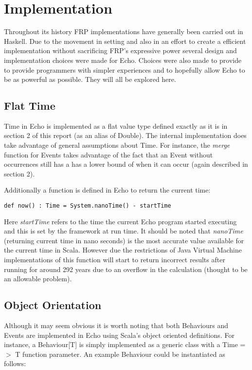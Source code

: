 \chapter{Implementation}
  Throughout its history FRP implementations have generally been carried out in Haskell. Due to the movement
  in setting and also in an effort to create a efficient implementation without sacrificing FRP's expressive power
  several design and implementation choices were made for Echo. Choices were also made
  to provide to provide programmers with simpler experiences and to hopefully allow Echo to be
  as powerful as possible. They will all be explored here.

  \section{Flat Time}
    Time in Echo is implemented as a flat value type defined exactly as it is in 
    section 2 of this report (as an alias of Double). The internal implementation does take advantage
    of general assumptions about Time. For instance, the \emph{merge} function for Events takes advantage
    of the fact that an Event without occurrences still has a has a lower bound of when it can occur (again described
    in section 2). 
    
    Additionally a function is defined in Echo to return the current time:
    
\begin{verbatim}
def now() : Time = System.nanoTime() - startTime
\end{verbatim}      

    Here \emph{startTime} refers to the time the current Echo program started executing and this is
    set by the framework at run time. It should be noted that \emph{nanoTime} (returning current time in
    nano seconds) is the most accurate value available for the current time in Scala. However due the restrictions
    of Java Virtual Machine implementations of this function will start to return incorrect results 
    after running for around 292 years due to an overflow in the calculation (thought to be an allowable
    problem).
    
  \section{Object Orientation}
    Although it may seem obvious it is worth noting that both Behaviours and Events are implemented in
    Echo using Scala's object oriented definitions. For instance, a Behaviour[T] is simply
    implemented as a generic class with a Time =$>$ T function parameter. An example Behaviour
    could be instantiated as follows:

